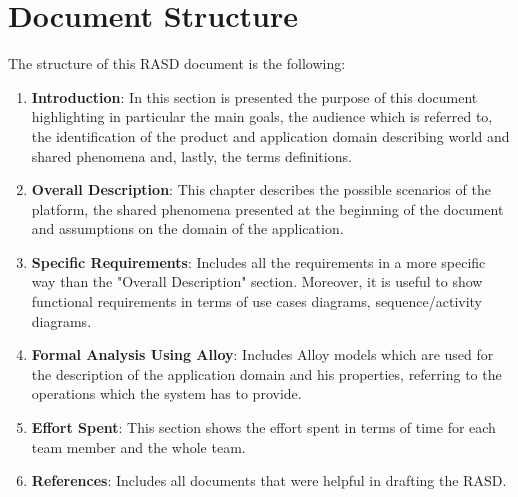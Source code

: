 \section{Document Structure}
The structure of this RASD document is the following:
\begin{enumerate}
    \item \textbf{Introduction}: In this section is presented the purpose of this document highlighting in particular the main goals, the audience which is referred to, the identification of the product and application domain  describing world and shared phenomena and, lastly, the terms definitions.
    \item \textbf{Overall Description}: This chapter describes the possible scenarios of the platform, the shared phenomena presented at the beginning of the document and assumptions on the domain of the application.
    \item \textbf{Specific Requirements}: Includes all the requirements in a more specific way than the "Overall Description" section. Moreover, it is useful to show functional requirements in terms of use cases diagrams, sequence/activity diagrams.
    \item \textbf{Formal Analysis Using Alloy}: Includes Alloy models which are used for the description of the application domain and his properties, referring to the operations which the system has to provide.
    \item \textbf{Effort Spent}: This section shows the effort spent in terms of time for each team member and the whole team.
    \item \textbf{References}: Includes all documents that were helpful in drafting the RASD.
\end{enumerate}

